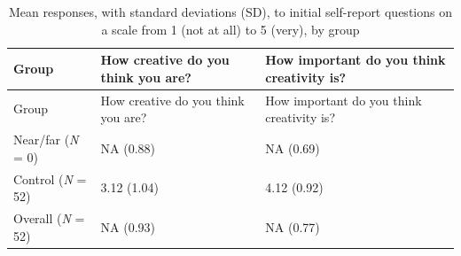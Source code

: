 \documentclass[english,man]{apa6}
\begin{document}
\begin{longtable}[]{@{}lll@{}}
\caption{Mean responses, with standard deviations (SD), to initial
self-report questions on a scale from 1 (not at all) to 5 (very), by
group}\tabularnewline
\toprule
\begin{minipage}[b]{0.34\columnwidth}\raggedright
Group\strut
\end{minipage} & \begin{minipage}[b]{0.26\columnwidth}\raggedright
How creative do you think you are?\strut
\end{minipage} & \begin{minipage}[b]{0.32\columnwidth}\raggedright
How important do you think creativity is?\strut
\end{minipage}\tabularnewline
\midrule
\endfirsthead
\toprule
\begin{minipage}[b]{0.34\columnwidth}\raggedright
Group\strut
\end{minipage} & \begin{minipage}[b]{0.26\columnwidth}\raggedright
How creative do you think you are?\strut
\end{minipage} & \begin{minipage}[b]{0.32\columnwidth}\raggedright
How important do you think creativity is?\strut
\end{minipage}\tabularnewline
\midrule
\endhead
\begin{minipage}[t]{0.34\columnwidth}\raggedright
Near/far (\emph{N} = 0)\strut
\end{minipage} & \begin{minipage}[t]{0.26\columnwidth}\raggedright
NA (0.88)\strut
\end{minipage} & \begin{minipage}[t]{0.32\columnwidth}\raggedright
NA (0.69)\strut
\end{minipage}\tabularnewline
\begin{minipage}[t]{0.34\columnwidth}\raggedright
Control (\emph{N} = 52)\strut
\end{minipage} & \begin{minipage}[t]{0.26\columnwidth}\raggedright
3.12 (1.04)\strut
\end{minipage} & \begin{minipage}[t]{0.32\columnwidth}\raggedright
4.12 (0.92)\strut
\end{minipage}\tabularnewline
\begin{minipage}[t]{0.34\columnwidth}\raggedright
Overall (\emph{N} = 52)\strut
\end{minipage} & \begin{minipage}[t]{0.26\columnwidth}\raggedright
NA (0.93)\strut
\end{minipage} & \begin{minipage}[t]{0.32\columnwidth}\raggedright
NA (0.77)\strut
\end{minipage}\tabularnewline
\bottomrule
\end{longtable}
\end{document}
